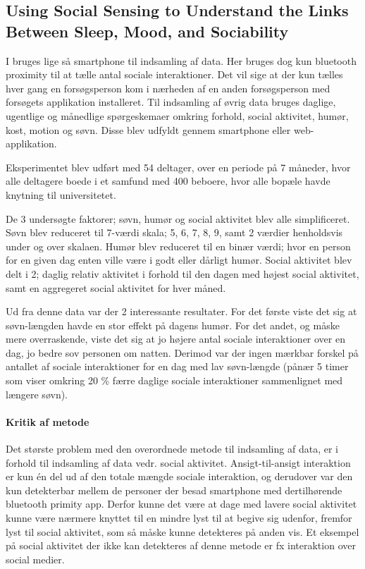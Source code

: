 \subsection{Using Social Sensing to Understand the Links Between Sleep, Mood, and Sociability}
I \citet{social_sensing_2} bruges lige så smartphone til indsamling af data.
Her bruges dog kun bluetooth proximity til at tælle antal sociale interaktioner.
Det vil sige at der kun tælles hver gang en forsøgsperson kom i nærheden af en anden forsøgsperson med forsøgets applikation installeret.
Til indsamling af øvrig data bruges daglige, ugentlige og månedlige spørgeskemaer omkring forhold, social aktivitet, humør, kost, motion og søvn.
Disse blev udfyldt gennem smartphone eller web-applikation.

Eksperimentet blev udført med 54 deltager, over en periode på 7 måneder, hvor alle deltagere boede i et samfund med 400 beboere, hvor alle bopæle havde knytning til universitetet.

De 3 undersøgte faktorer; søvn, humør og social aktivitet blev alle simplificeret.
Søvn blev reduceret til 7-værdi skala; 5, 6, 7, 8, 9, samt 2 værdier henholdsvis under og over skalaen.
Humør blev reduceret til en binær værdi; hvor en person for en given dag enten ville være i godt eller dårligt humør.
Social aktivitet blev delt i 2; daglig relativ aktivitet i forhold til den dagen med højest social aktivitet, samt en aggregeret social aktivitet for hver måned.

Ud fra denne data var der 2 interessante resultater.
For det første viste det sig at søvn-længden havde en stor effekt på dagens humør.
For det andet, og måske mere overraskende, viste det sig at jo højere antal sociale interaktioner over en dag, jo bedre sov personen om natten.
Derimod var der ingen mærkbar forskel på antallet af sociale interaktioner for en dag med lav søvn-længde (pånær 5 timer som viser omkring 20 \% færre daglige sociale interaktioner sammenlignet med længere søvn).

\paragraph{Kritik af metode}
Det største problem med den overordnede metode til indsamling af data, er i forhold til indsamling af data vedr. social aktivitet.
Ansigt-til-ansigt interaktion er kun én del ud af den totale mængde sociale interaktion, og derudover var den kun detekterbar mellem de personer der besad smartphone med dertilhørende bluetooth primity app.
Derfor kunne det være at dage med lavere social aktivitet kunne være nærmere knyttet til en mindre lyst til at begive sig udenfor, fremfor lyst til social aktivitet, som så måske kunne detekteres på anden vis.
Et eksempel på social aktivitet der ikke kan detekteres af denne metode er fx interaktion over social medier.


